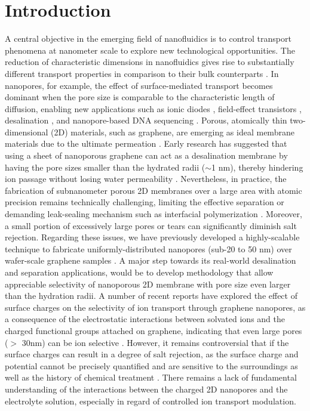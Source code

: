 \documentclass[journal=nalefd,email=true, hyperref=true, keywords=false]{achemso}
\begin{document}
\section{Introduction}
\label{sec:intro}
A central objective in the emerging field of nanofluidics is to
control transport phenomena at nanometer scale to explore new
technological opportunities. The reduction of characteristic
dimensions in nanofluidics gives rise to substantially different
transport properties in comparison to their bulk counterparts
\cite{Schoch_2008}. In nanopores, for example, the effect of
surface-mediated transport becomes dominant when the pore size is
comparable to the characteristic length of diffusion, enabling new
applications such as ionic diodes
\cite{Karnik_2007,siwy2002fabrication,vlassiouk2007nanofluidic},
field-effect transistors \cite{Nam_2009}, desalination
\cite{Heiranian_2015}, and nanopore-based DNA sequencing
\cite{Heerema_2016,Garaj_2013}. Porous, atomically thin
two-dimensional (2D) materials, such as graphene, are emerging as
ideal membrane materials due to the ultimate permeation
\cite{Suk_2010,Jiang_2009,Celebi_2014,Koenig_2012,Drahushuk_2012}. Early
research has suggested that using a sheet of nanoporous graphene can
act as a desalination membrane by having the pore sizes smaller than
the hydrated radii ($\sim$1 nm), thereby hindering ion passage without
losing water permeability
\cite{Cohen_Tanugi_2012,Suk_2014,Cohen_Tanugi_2014,Cohen_Tanugi_2015,O_Hern_2014,O_Hern_2015,Surwade_2015,Walker_2017,Ghosh_2018}.
Nevertheless, in practice, the fabrication of subnanometer porous 2D
membranes over a large area with atomic precision remains technically
challenging, { limiting the effective separation or demanding
  leak-sealing mechanism such as interfacial polymerization}
\cite{Suk_2014,Rollings_2016,O_Hern_2012,Wang_2017}. Moreover, a small
portion of excessively large pores or tears can significantly diminish
salt rejection. Regarding these issues, we have previously developed a
highly-scalable technique to fabricate uniformly-distributed nanopores
(sub-20 to 50 nm) over wafer-scale graphene samples
\cite{Choi_2018}. A major step towards its real-world desalination and
separation applications, would be to develop methodology that allow
appreciable selectivity of nanoporous 2D membrane with pore size even
larger than the hydration radii.
A number of recent reports have explored the
effect of surface charges on the selectivity of ion transport through
graphene nanopores, as a consequence of the electrostatic interactions
between solvated ions and the charged functional groups attached on
graphene, indicating that even large pores ($>$ 30nm) can be ion
selective \cite{Rollings_2016,Surwade_2014}. However, it remains
controversial that if the surface charges can result in a degree of
salt rejection, as the surface charge and potential cannot be
precisely quantified and are sensitive to the surroundings as well as
the history of chemical treatment \cite{Li_2008}. There remains a lack
of fundamental understanding of the interactions between the charged
2D nanopores and the electrolyte solution, { especially in regard of controlled ion transport modulation}. 
\end{document}
